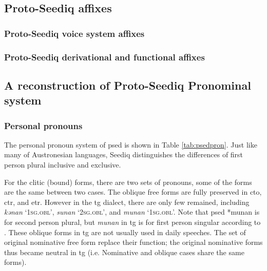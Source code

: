 \subsection{Proto-Seediq affixes}
\lipsum[1]

\subsubsection{Proto-Seediq voice system affixes}
\lipsum[1-10]

\subsubsection{Proto-Seediq derivational and functional affixes}
\lipsum[1-10]

\subsection{A reconstruction of Proto-Seediq Pronominal system}
\lipsum[1]

\subsubsection{Personal pronouns}

The personal pronoun system of \acl{psed} is shown in Table \ref{tab:psedpron}. Just like many of Austronesian languages, Seediq distinguishes the differences of first person plural inclusive and exclusive. 

For the clitic (bound) forms, there are two sets of pronouns, some of the forms are the same between two cases. The oblique free forms are fully preserved in \acl{cto}, \acl{ctr}, and \acl{etr}. However in the \acl{tg} dialect, there are only few remained, including \textit{kənan} `\textsc{1sg.obl}', \textit{sunan} `\textsc{2sg.obl}', and \textit{munan} `\textsc{1sg.obl}'. Note that \acl{psed} *munan is for second person plural, but \textit{munan} in \acl{tg} is for first person singular according to \textcite[62]{Sung2018Sedgrammar}. These oblique forms in \acl{tg} are not usually used in daily speeches. The set of original nominative free form replace their function; the original nominative forms thus became neutral in \acl{tg} (i.e. Nominative and oblique cases share the same forms).

